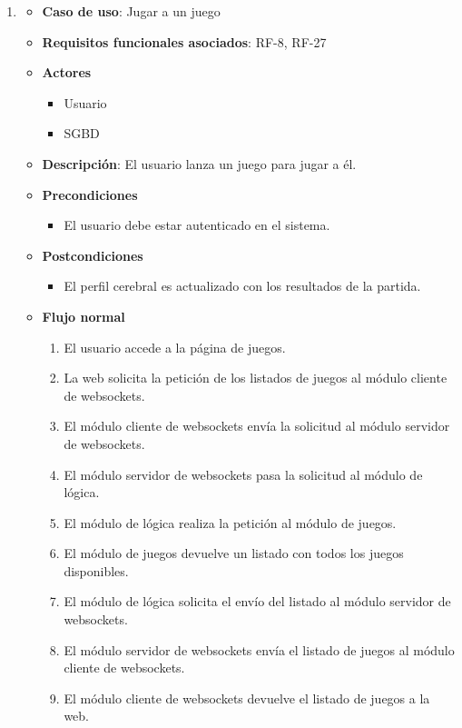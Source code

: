 \begin{enumerate}
\item %
  \begin{itemize}
  \item \textbf{Caso de uso}: Jugar a un juego
  \item \textbf{Requisitos funcionales asociados}: RF-8, RF-27
  \item \textbf{Actores}
    \begin{itemize}
    \item Usuario
    \item SGBD
    \end{itemize}
  \item \textbf{Descripción}: El usuario lanza un juego para jugar a él.
  \item \textbf{Precondiciones}
    \begin{itemize}
    \item El usuario debe estar autenticado en el sistema.
    \end{itemize}
  \item \textbf{Postcondiciones}
    \begin{itemize}
    \item El perfil cerebral es actualizado con los resultados de la partida.
    \end{itemize}
  \item \textbf{Flujo normal}
    \begin{enumerate}
    \item El usuario accede a la página de juegos.
    \item La web solicita la petición de los listados de juegos al módulo cliente de websockets.
    \item El módulo cliente de websockets envía la solicitud al módulo servidor de websockets.
    \item El módulo servidor de websockets pasa la solicitud al módulo de lógica.
    \item El módulo de lógica realiza la petición al módulo de juegos.
    \item El módulo de juegos devuelve un listado con todos los juegos disponibles.
    \item El módulo de lógica solicita el envío del listado al módulo servidor de websockets.
    \item El módulo servidor de websockets envía el listado de juegos al módulo cliente de websockets.
    \item El módulo cliente de websockets devuelve el listado de juegos a la web.

\end{enumerate}
\end{itemize}
\end{enumerate}
